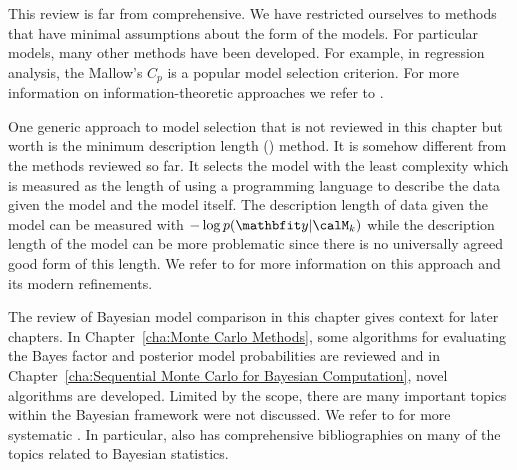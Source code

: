 This review is far from comprehensive. We have restricted ourselves to methods that have minimal assumptions about the form of the models. For particular models, many other methods have been developed. For example, in regression analysis, the Mallow's $C_p$ is a popular model selection criterion. For more information on information-theoretic approaches we refer to \cite{Burnham:2002wc,Claeskens:2008tq}.

One generic approach to model selection that is not reviewed in this chapter but worth  is the minimum description length (\mdl) method. It is somehow different from the methods reviewed so far. It selects the model with the least complexity which is measured as the length of using a programming language to describe the data given the model and the model itself. The description length of data given the model can be measured with $-\log p(\data|\calM_k)$ while the description length of the model can be more problematic since there is no universally agreed good form of this length. We refer to \cite{Grunwald:2005vx} for more information on this approach and its modern refinements.

The review of Bayesian model comparison in this chapter gives context for later chapters. In Chapter~\ref{cha:Monte Carlo Methods}, some algorithms for evaluating the Bayes factor and posterior model probabilities are reviewed and in Chapter~\ref{cha:Sequential Monte Carlo for Bayesian Computation}, novel algorithms are developed. Limited by the scope, there are many important topics within the Bayesian framework  were not discussed. We refer to \cite{Bernardo:1994vd,Robert:2007tc} for  more systematic . In particular, \cite{Bernardo:1994vd} also has comprehensive bibliographies on many of the topics related to Bayesian statistics.
